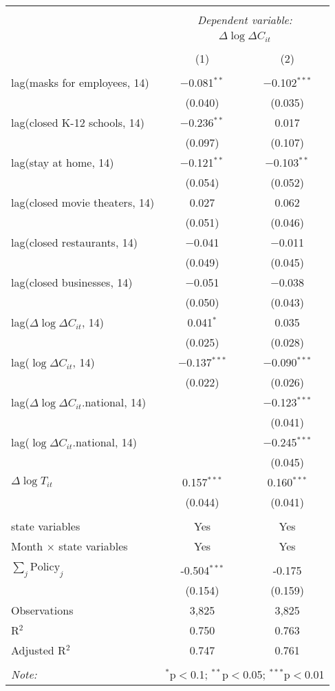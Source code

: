\begin{tabular}{@{\extracolsep{1pt}}lcc} 
\\[-1.8ex]\hline 
\hline \\[-1.8ex] 
 & \multicolumn{2}{c}{\textit{Dependent variable:}} \\ 
\cline{2-3} 
 & \multicolumn{2}{c}{$\Delta \log \Delta C_{it}$} \\ 
\\[-1.8ex] & (1) & (2)\\ 
\hline \\[-1.8ex] 
 lag(masks for employees, 14) & $-$0.081$^{**}$ & $-$0.102$^{***}$ \\ 
  & (0.040) & (0.035) \\ 
  lag(closed K-12 schools, 14) & $-$0.236$^{**}$ & 0.017 \\ 
  & (0.097) & (0.107) \\ 
  lag(stay at home, 14) & $-$0.121$^{**}$ & $-$0.103$^{**}$ \\ 
  & (0.054) & (0.052) \\ 
  lag(closed movie theaters, 14) & 0.027 & 0.062 \\ 
  & (0.051) & (0.046) \\ 
  lag(closed restaurants, 14) & $-$0.041 & $-$0.011 \\ 
  & (0.049) & (0.045) \\ 
  lag(closed businesses, 14) & $-$0.051 & $-$0.038 \\ 
  & (0.050) & (0.043) \\ 
  lag($\Delta \log \Delta C_{it}$, 14) & 0.041$^{*}$ & 0.035 \\ 
  & (0.025) & (0.028) \\ 
  lag($\log \Delta C_{it}$, 14) & $-$0.137$^{***}$ & $-$0.090$^{***}$ \\ 
  & (0.022) & (0.026) \\ 
  lag($\Delta \log \Delta C_{it}$.national, 14) &  & $-$0.123$^{***}$ \\ 
  &  & (0.041) \\ 
  lag($\log \Delta C_{it}$.national, 14) &  & $-$0.245$^{***}$ \\ 
  &  & (0.045) \\ 
  $\Delta \log T_{it}$ & 0.157$^{***}$ & 0.160$^{***}$ \\ 
  & (0.044) & (0.041) \\ 
 \hline \\[-1.8ex] 
state variables & Yes & Yes \\ 
Month $\times$ state variables & Yes & Yes \\ 
\hline \\[-1.8ex] 
$\sum_j \mathrm{Policy}_j$ & -0.504$^{***}$ & -0.175 \\ 
 & (0.154) & (0.159) \\ 
Observations & 3,825 & 3,825 \\ 
R$^{2}$ & 0.750 & 0.763 \\ 
Adjusted R$^{2}$ & 0.747 & 0.761 \\ 
\hline 
\hline \\[-1.8ex] 
\textit{Note:}  & \multicolumn{2}{r}{$^{*}$p$<$0.1; $^{**}$p$<$0.05; $^{***}$p$<$0.01} \\ 
\end{tabular} 
